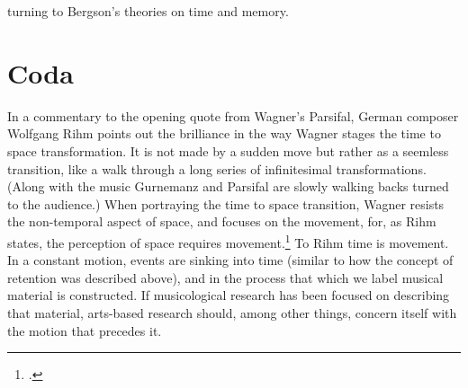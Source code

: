 turning to Bergson's theories on time and memory.







\section{Coda}
\label{sec:coda}

In a commentary to the opening quote from Wagner's Parsifal, German composer Wolfgang Rihm points out the brilliance in the way Wagner stages the time to space transformation. It is not made by a sudden move but rather as a seemless transition, like a walk through a long series of infinitesimal transformations. (Along with the music Gurnemanz and Parsifal are slowly walking backs turned to the audience.) When portraying the time to space transition, Wagner resists the non-temporal aspect of space, and focuses on the movement, for, as Rihm states, the perception of space requires movement.\footcite{rihm01} To Rihm time is movement. In a constant motion, events are sinking into time (similar to how the concept of retention was described above), and in the process that which we label musical material is constructed. If musicological research has been focused on describing that material, arts-based research should, among other things, concern itself with the motion that precedes it.



